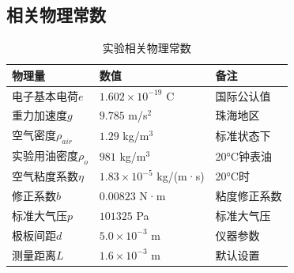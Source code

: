 \documentclass[dvipsnames, svgnames,a4paper,11pt]{article}
\newcommand{\recordblank}[1]{\par\vspace*{#1}\par}
\begin{document}
\recordblank{7cm}

\vspace{5cm}

\subsection{相关物理常数}
\begin{table}[H]
\centering
\renewcommand\arraystretch{1.5}
\caption{实验相关物理常数}
\begin{tabularx}{\textwidth}{|X|X|X|}
\hline
\textbf{物理量} & \textbf{数值} & \textbf{备注} \\
\hline
电子基本电荷$e$ & $1.602 \times 10^{-19}$ C & 国际公认值 \\
\hline
重力加速度$g$ & $9.785$ m/s$^2$ & 珠海地区 \\
\hline
空气密度$\rho_{air}$ & $1.29$ kg/m$^3$ & 标准状态下 \\
\hline
实验用油密度$\rho_o$ & $981$ kg/m$^3$ & 20°C钟表油 \\
\hline
空气粘度系数$\eta$ & $1.83 \times 10^{-5}$ kg/(m·s) & 20°C时 \\
\hline
修正系数$b$ & $0.00823$ N·m & 粘度修正系数 \\
\hline
标准大气压$p$ & $101325$ Pa & 标准大气压 \\
\hline
极板间距$d$ & $5.0 \times 10^{-3}$ m & 仪器参数 \\
\hline
测量距离$L$ & $1.6 \times 10^{-3}$ m & 默认设置 \\
\hline
\end{tabularx}
\end{table}


\recordblank{7cm}


\recordblank{7cm}


\recordblank{7cm}
\end{document}
